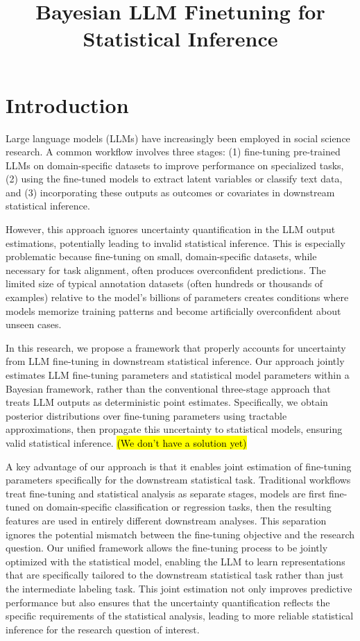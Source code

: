 \documentclass[11pt]{article}
\title{Bayesian LLM Finetuning for Statistical Inference}
\author{}
\date{}
\begin{document}
\maketitle
\vspace{-1in}

\section{Introduction}

Large language models (LLMs) have increasingly been employed in social science research. A common workflow involves three stages: (1) fine-tuning pre-trained LLMs on domain-specific datasets to improve performance on specialized tasks, (2) using the fine-tuned models to extract latent variables or classify text data, and (3) incorporating these outputs as outcomes or covariates in downstream statistical inference.

However, this approach ignores uncertainty quantification in the LLM output estimations, potentially leading to invalid statistical inference. This is especially problematic because fine-tuning on small, domain-specific datasets, while necessary for task alignment, often produces overconfident predictions. The limited size of typical annotation datasets (often hundreds or thousands of examples) relative to the model's billions of parameters creates conditions where models memorize training patterns and become artificially overconfident about unseen cases.

In this research, we propose a framework that properly accounts for uncertainty from LLM fine-tuning in downstream statistical inference. Our approach jointly estimates LLM fine-tuning parameters and statistical model parameters within a Bayesian framework, rather than the conventional three-stage approach that treats LLM outputs as deterministic point estimates. Specifically, we obtain posterior distributions over fine-tuning parameters using tractable approximations, then propagate this uncertainty to statistical models, ensuring valid statistical inference. \hl{(We don't have a solution yet)}

A key advantage of our approach is that it enables joint estimation of fine-tuning parameters specifically for the downstream statistical task. Traditional workflows treat fine-tuning and statistical analysis as separate stages, models are first fine-tuned on domain-specific classification or regression tasks, then the resulting features are used in entirely different downstream analyses. This separation ignores the potential mismatch between the fine-tuning objective and the research question. Our unified framework allows the fine-tuning process to be jointly optimized with the statistical model, enabling the LLM to learn representations that are specifically tailored to the downstream statistical task rather than just the intermediate labeling task. This joint estimation not only improves predictive performance but also ensures that the uncertainty quantification reflects the specific requirements of the statistical analysis, leading to more reliable statistical inference for the research question of interest.
\end{document}
